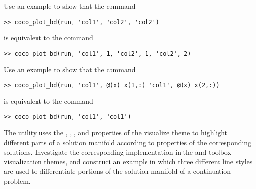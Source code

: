 \begin{exercises}
\item Use an example to show that the command
\begin{lstlisting}[language=coco-highlight]
>> coco_plot_bd(run, 'col1', 'col2', 'col2')
\end{lstlisting}
is equivalent to the command
\begin{lstlisting}[language=coco-highlight]
>> coco_plot_bd(run, 'col1', 1, 'col2', 1, 'col2', 2)
\end{lstlisting}

\item Use an example to show that the command
\begin{lstlisting}[language=coco-highlight]
>> coco_plot_bd(run, 'col1', @(x) x(1,:) 'col1', @(x) x(2,:))
\end{lstlisting}
is equivalent to the command
\begin{lstlisting}[language=coco-highlight]
>> coco_plot_bd(run, 'col1', 'col1')
\end{lstlisting}


\item The  utility uses the , , , and  properties of the visualize theme to highlight different parts of a solution manifold according to properties of the corresponding solutions. Investigate the corresponding implementation in the  and  toolbox visualization themes, and construct an example in which three different line styles are used to differentiate portions of the solution manifold of a continuation problem.

\end{exercises}

%
%
%
%








